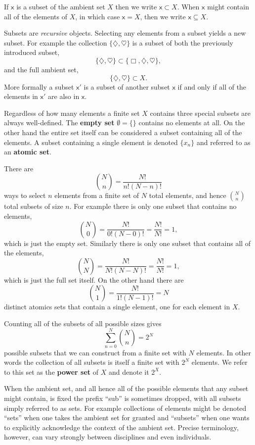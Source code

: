 \documentclass[
  letterpaper,
  DIV=11,
  numbers=noendperiod]{scrartcl}
\begin{document}
If \(\mathsf{x}\) is a subset of the ambient set \(X\) then we write
\(\mathsf{x} \subset X\). When \(\mathsf{x}\) might contain all of the
elements of \(X\), in which case \(\mathsf{x} = X\), then we write
\(\mathsf{x} \subseteq X\).

Subsets are \emph{recursive} objects. Selecting any elements from a
subset yields a new subset. For example the collection
\(\{\diamondsuit, \heartsuit\}\) is a subset of both the previously
introduced subset, \[
\{ \diamondsuit, \heartsuit \} \subset \{ \Box, \diamondsuit, \heartsuit \},
\] and the full ambient set, \[
\{ \diamondsuit, \heartsuit \} \subset X.
\] More formally a subset \(\mathsf{x}'\) is a subset of another subset
\(\mathsf{x}\) if and only if all of the elements in \(\mathsf{x}'\) are
also in \(\mathsf{x}\).

Regardless of how many elements a finite set \(X\) contains three
special subsets are always well-defined. The \textbf{empty set}
\(\emptyset = \{\}\) contains no elements at all. On the other hand the
entire set itself can be considered a subset containing all of the
elements. A subset containing a single element is denoted
\(\{ x_{n} \}\) and referred to as an \textbf{atomic set}.

There are \[
{N \choose n} = \frac{ N! }{ n! (N - n)!}
\] ways to select \(n\) elements from a finite set of \(N\) total
elements, and hence \({N \choose n}\) total subsets of size \(n\). For
example there is only one subset that contains no elements, \[
{N \choose 0} = \frac{ N! }{ 0! (N - 0)!} = \frac{ N! }{ N! } = 1,
\] which is just the empty set. Similarly there is only one subset that
contains all of the elements, \[
{N \choose N} = \frac{ N! }{ N! (N - N)!} = \frac{ N! }{ N! } = 1,
\] which is just the full set itself. On the other hand there are \[
{N \choose 1} = \frac{ N! }{ 1! (N - 1)!} = N
\] distinct atomics sets that contain a single element, one for each
element in \(X\).

Counting all of the subsets of all possible sizes gives \[
\sum_{n = 0}^{N} {N \choose n} = 2^{N}
\] possible subsets that we can construct from a finite set with \(N\)
elements. In other words the collection of all subsets is itself a
finite set with \(2^{N}\) elements. We refer to this set as the
\textbf{power set} of \(X\) and denote it \(2^{X}\).

When the ambient set, and all hence all of the possible elements that
any subset might contain, is fixed the prefix ``sub'' is sometimes
dropped, with all subsets simply referred to as sets. For example
collections of elements might be denoted ``sets'' when one takes the
ambient set for granted and ``subsets'' when one wants to explicitly
acknowledge the context of the ambient set. Precise terminology,
however, can vary strongly between disciplines and even individuals.
\end{document}
